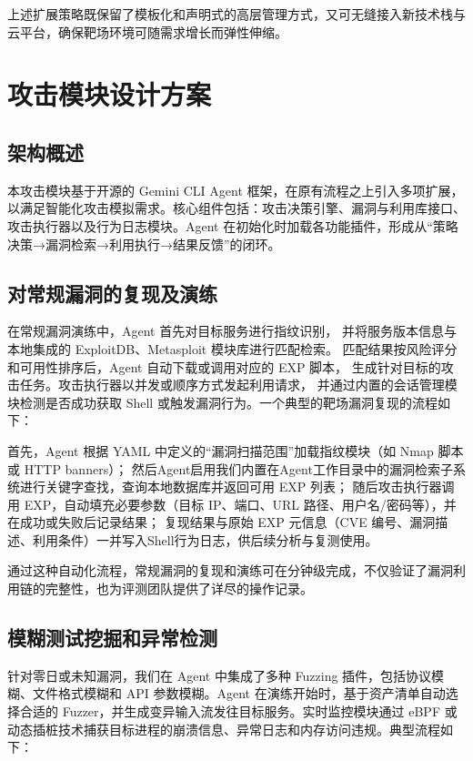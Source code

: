 \documentclass[lang=cn,10pt]{elegantbook}
\begin{document}
上述扩展策略既保留了模板化和声明式的高层管理方式，又可无缝接入新技术栈与云平台，确保靶场环境可随需求增长而弹性伸缩。


\section{攻击模块设计方案}
\subsection{架构概述}
本攻击模块基于开源的 Gemini CLI Agent 框架，在原有流程之上引入多项扩展，以满足智能化攻击模拟需求。核心组件包括：攻击决策引擎、漏洞与利用库接口、攻击执行器以及行为日志模块。Agent 在初始化时加载各功能插件，形成从“策略决策→漏洞检索→利用执行→结果反馈”的闭环。

\subsection{对常规漏洞的复现及演练}

在常规漏洞演练中，Agent 首先对目标服务进行指纹识别，
并将服务版本信息与本地集成的 ExploitDB、Metasploit 模块库进行匹配检索。
匹配结果按风险评分和可用性排序后，Agent 自动下载或调用对应的 EXP 脚本，
生成针对目标的攻击任务。攻击执行器以并发或顺序方式发起利用请求，
并通过内置的会话管理模块检测是否成功获取 Shell 或触发漏洞行为。一个典型的靶场漏洞复现的流程如下：

首先，Agent 根据 YAML 中定义的“漏洞扫描范围”加载指纹模块（如 Nmap 脚本或 HTTP banners）；  
然后Agent启用我们内置在Agent工作目录中的漏洞检索子系统进行关键字查找，查询本地数据库并返回可用 EXP 列表；  
随后攻击执行器调用 EXP，自动填充必要参数（目标 IP、端口、URL 路径、用户名/密码等），并在成功或失败后记录结果；  
复现结果与原始 EXP 元信息（CVE 编号、漏洞描述、利用条件）一并写入Shell行为日志，供后续分析与复测使用。

通过这种自动化流程，常规漏洞的复现和演练可在分钟级完成，不仅验证了漏洞利用链的完整性，也为评测团队提供了详尽的操作记录。

\subsection{模糊测试挖掘和异常检测}

针对零日或未知漏洞，我们在 Agent 中集成了多种 Fuzzing 插件，包括协议模糊、文件格式模糊和 API 参数模糊。Agent 在演练开始时，基于资产清单自动选择合适的 Fuzzer，并生成变异输入流发往目标服务。实时监控模块通过 eBPF 或动态插桩技术捕获目标进程的崩溃信息、异常日志和内存访问违规。典型流程如下：
\end{document}
